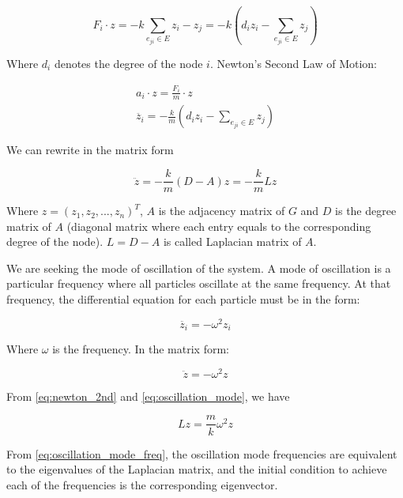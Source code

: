 \documentclass{article}
\begin{document}
\begin{equation}
    F_i \cdot z = - k \sum_{e_{j i} \in E} z_i - z_j = - k (d_i z_i - \sum_{e_{j i} \in E} z_j)
\end{equation}

Where $d_i$ denotes the degree of the node $i$. Newton's Second Law of Motion:

\begin{gather*}
    a_i \cdot z = \frac{F_i}{m} \cdot z \\
    \ddot{z_i} = - \frac{k}{m} (d_i z_i - \sum_{e_{j i} \in E} z_j)
\end{gather*}

We can rewrite in the matrix form

\begin{equation}
    \ddot{z} =  - \frac{k}{m} (D - A) z = - \frac{k}{m} L z
    \label{eq:newton_2nd}
\end{equation}

Where $z = (z_1, z_2, ..., z_n)^T$, $A$ is the adjacency matrix of $G$ and $D$ is the degree matrix of $A$ (diagonal matrix where each entry equals to the corresponding degree of the node). $L = D - A$ is called Laplacian matrix of $A$.

We are seeking the mode of oscillation of the system. A mode of oscillation is a particular frequency where all particles oscillate at the same frequency. At that frequency, the differential equation for each particle must be in the form:

\begin{equation}
    \ddot{z_i} = - \omega^2 z_i
\end{equation}

Where $\omega$ is the frequency. In the matrix form:

\begin{equation}
    \ddot{z} = - \omega^2 z
    \label{eq:oscillation_mode}
\end{equation}

From \ref{eq:newton_2nd} and \ref{eq:oscillation_mode}, we have

\begin{equation}
    L z = \frac{m}{k} \omega^2 z
    \label{eq:oscillation_mode_freq}
\end{equation}

From \ref{eq:oscillation_mode_freq}, the oscillation mode frequencies are equivalent to the eigenvalues of the Laplacian matrix, and the initial condition to achieve each of the frequencies is the corresponding eigenvector.
\end{document}
